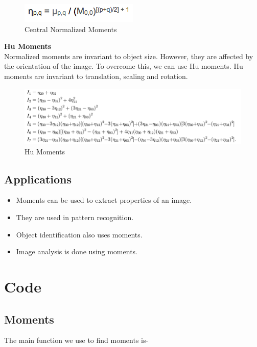\documentclass[]{article}
\providecommand{\tightlist}{%
  \setlength{\itemsep}{0pt}\setlength{\parskip}{0pt}}
\begin{document}
\begin{figure}[htbp]
\centering
\includegraphics{images/Moments/central normalized moments.png}
\caption{Central Normalized Moments}
\end{figure}
\pagebreak
\textbf{Hu Moments} \\

Normalized moments are invariant to object size. However, they are
affected by the orientation of the image. To overcome this, we can use
Hu moments. Hu moments are invariant to translation, scaling and
rotation.

\begin{figure}[htbp]
\centering
\includegraphics{images/Moments/hu.png}
\caption{Hu Moments}
\end{figure}

\subsection{Applications}\label{applications}

\begin{itemize}
\tightlist
\item
  Moments can be used to extract properties of an image.
\item
  They are used in pattern recognition.
\item
  Object identification also uses moments.
\item
  Image analysis is done using moments.
\end{itemize}

\section{Code}\label{code}

\subsection{Moments}\label{moments}

The main function we use to find moments is-
\end{document}

